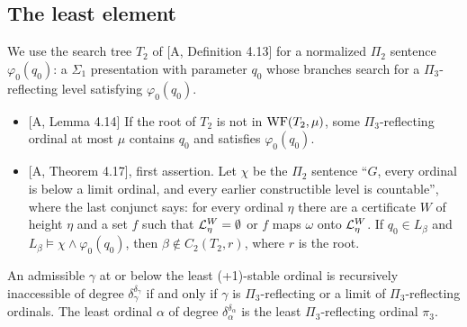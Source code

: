 \documentclass[11pt]{article}
\begin{document}
\subsection{The least element}

We use the search tree $T_2$ of [A, Definition 4.13] for a normalized $\Pi_2$ sentence $\varphi_0(q_0)$: a $\Sigma_1$
presentation with parameter $q_0$ whose branches search for a $\Pi_3$-reflecting level satisfying $\varphi_0(q_0)$.
\begin{itemize}
\item {[A, Lemma 4.14]} If the root of $T_2$ is not in $\mathrm{WF}(T_2,\mu)$, some $\Pi_3$-reflecting ordinal at most $\mu$
  contains $q_0$ and satisfies $\varphi_0(q_0)$.
\item {[A, Theorem 4.17]}, first assertion. Let $\chi$ be the $\Pi_2$ sentence ``$G$, every ordinal is below a limit
  ordinal, and every earlier constructible level is countable'', where the last conjunct says: for every ordinal $\eta$
  there are a certificate $W$ of height $\eta$ and a set $f$ such that $\mathcal{L}^W_\eta = \emptyset$ or $f$ maps $\omega$
  onto $\mathcal{L}^W_\eta$. If $q_0 \in L_\beta$ and $L_\beta \models \chi \wedge \varphi_0(q_0)$, then $\beta \notin C_2(T_2,
  r)$, where $r$ is the root.
\end{itemize}

\begin{statement} An admissible $\gamma$ at or below the least (+1)-stable ordinal is
recursively inaccessible of degree
$\delta_\gamma^{\delta_\gamma}$ if and only if $\gamma$ is $\Pi_3$-reflecting or a limit of $\Pi_3$-reflecting
ordinals. The least ordinal $\alpha$ of degree $\delta_\alpha^{\delta_\alpha}$ is the least $\Pi_3$-reflecting ordinal
$\pi_3$.
\end{statement}
\end{document}
